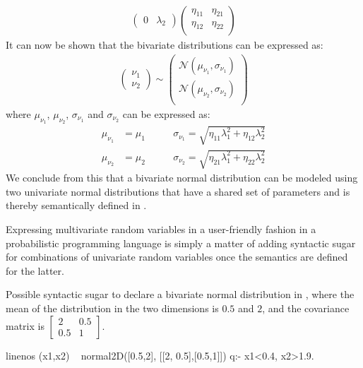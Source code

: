 \begin{example}
\begin{align*}
\begin{pmatrix}
			0         & \lambda_2
		\end{pmatrix}
		\begin{pmatrix}
			\eta_{11} & \eta_{21} \\
			\eta_{12} & \eta_{22} \\
		\end{pmatrix}
	\end{align*}
	It can now be shown that the bivariate distributions can be expressed as:
	\begin{align*}
		\begin{pmatrix} \nu_1 \\ \nu_2 \end{pmatrix}
		\sim
		\begin{pmatrix}
			\mathcal{N}(\mu_{\nu_1}, \sigma_{\nu_1}) \\
			\mathcal{N}(\mu_{\nu_2}, \sigma_{\nu_2}) \\
		\end{pmatrix}
	\end{align*}
	where $\mu_{\nu_1}$, $\mu_{\nu_2}$, $\sigma_{\nu_1}$ and $\sigma_{\nu_2}$ can be expressed as:
	\begin{align*}
		\mu_{\nu_1} & = \mu_1 \qquad
		            & \sigma_{\nu_1} = \sqrt{ \eta_{11}\lambda_1^2 + \eta_{12}\lambda_2^2 } \\
		\mu_{\nu_2} & = \mu_2 \qquad
		            & \sigma_{\nu_2} = \sqrt{ \eta_{21}\lambda_1^2 + \eta_{22}\lambda_2^2 }
	\end{align*}
	We conclude from this that a bivariate normal distribution can be modeled using two univariate normal distributions that have a shared set of parameters and is thereby semantically defined in \dcproblogsty.

\end{example}

Expressing multivariate random variables in a user-friendly fashion in a probabilistic programming language is simply a matter of adding syntactic sugar for combinations of univariate random variables once the semantics are defined for the latter.

\begin{example}
	Possible syntactic sugar to declare a bivariate normal distribution in \dcproblogsty, where the mean of the distribution in the two dimensions is $0.5$ and $2$, and the covariance matrix is
	$
		\begin{bmatrix}
			2   & 0.5 \\
			0.5 & 1
		\end{bmatrix}
	$.
	\begin{problog*}{linenos}
(x1,x2) ~ normal2D([0.5,2], [[2, 0.5],[0.5,1]])
q:- x1<0.4, x2>1.9.
	\end{problog*}
\end{example}


